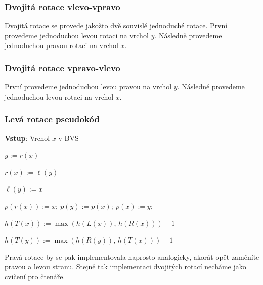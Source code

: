 

\newpage

\subsubsection{Dvojitá rotace vlevo-vpravo}

Dvojitá rotace se provede jakožto dvě souvislé jednoduché rotace. První provedeme jednoduchou levou rotaci na vrchol $y$. Následně provedeme jednoduchou pravou rotaci na vrchol $x$.



\bigskip

\subsubsection{Dvojitá rotace vpravo-vlevo}

\noindent První provedeme jednoduchou levou pravou na vrchol $y$. Následně provedeme jednoduchou levou rotaci na vrchol $x$.



\newpage

\subsubsection{Levá rotace pseudokód}

\noindent \textbf{Vstup}: Vrchol $x$ v BVS \newline
{}
\begin{pseudocode}
    \item $y := r(x)$
    \item $r(x) := \ell(y)$
    \item $\ell(y) := x$
    \item $p(r(x)) := x;\ p(y) := p(x);\ p(x) := y;$
    \item $h(T(x)) := \max(h(L(x)),\, h(R(x))) + 1$
    \item $h(T(y)) := \max(h(R(y)),\, h(T(x))) + 1$
\end{pseudocode} \bigskip


\noindent Pravá rotace by se pak implementovala naprosto analogicky, akorát opět zaměníte pravou a levou stranu. Stejně tak implementaci dvojitých rotací necháme jako cvičení pro čtenáře.

